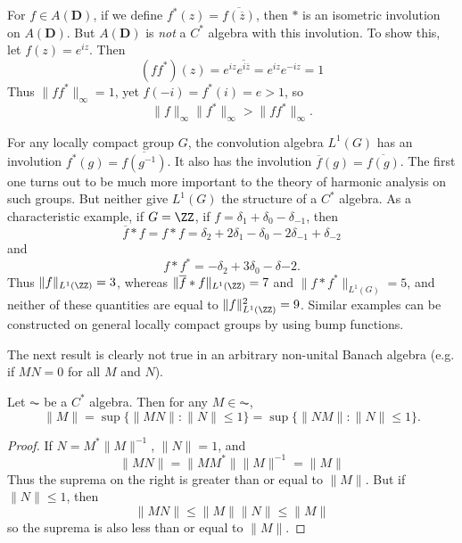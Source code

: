 \begin{example}
    For $f \in A(\mathbf{D})$, if we define $f^*(z) = \overline{f(\overline{z})}$, then $*$ is an isometric involution on $A(\mathbf{D})$. But $A(\mathbf{D})$ is \emph{not} a $C^*$ algebra with this involution. To show this, let $f(z) = e^{iz}$. Then
    \[ (ff^*)(z) = e^{iz} \overline{e^{i\overline{z}}} = e^{iz} e^{-iz} = 1 \]
    Thus $\| f f^* \|_\infty = 1$, yet $f(-i) = f^*(i) = e > 1$, so
    \[ \| f \|_\infty \| f^* \|_\infty > \| ff^* \|_\infty. \]
\end{example}

\begin{example}
    For any locally compact group $G$, the convolution algebra $L^1(G)$ has an involution $f^*(g) = \overline{f(g^{-1})}$. It also has the involution $\overline{f}(g) = \overline{f(g)}$. The first one turns out to be much more important to the theory of harmonic analysis on such groups. But neither give $L^1(G)$ the structure of a $C^*$ algebra. As a characteristic example, if $G = \ZZ$, if $f = \delta_1 + \delta_0 - \delta_{-1}$, then
    \[ \overline{f} * f = f * f = \delta_2 + 2 \delta_1 - \delta_0 - 2 \delta_{-1} + \delta_{-2} \]
    and
    \[ f * f^* = - \delta_2 + 3 \delta_0 - \delta{-2}. \]
    Thus $\| f \|_{L^1(\ZZ)} = 3$, whereas $\| \overline{f} * f \|_{L^1(\ZZ)} = 7$ and $\| f * f^* \|_{L^1(G)} = 5$, and neither of these quantities are equal to $\| f \|_{L^1(\ZZ)}^2 = 9$. Similar examples can be constructed on general locally compact groups by using bump functions.
\end{example}

The next result is clearly not true in an arbitrary non-unital Banach algebra (e.g. if $MN = 0$ for all $M$ and $N$).

\begin{prop}
    Let $\AC$ be a $C^*$ algebra. Then for any $M \in \AC$,
    \[ \| M \| = \sup \{ \| MN \| : \| N \| \leq 1 \} = \sup \{ \| NM \| : \| N \| \leq 1 \}. \]
\end{prop}
\begin{proof}
    If $N = M^* \|M\|^{-1}$, $\| N \| = 1$, and
    \[ \| MN \| = \| MM^* \| \| M \|^{-1} = \| M \| \]
    Thus the suprema on the right is greater than or equal to $\| M \|$. But if $\| N \| \leq 1$, then
    \[ \| MN \| \leq \| M \| \| N \| \leq \| M \| \]
    so the suprema is also less than or equal to $\| M \|$.
\end{proof}


